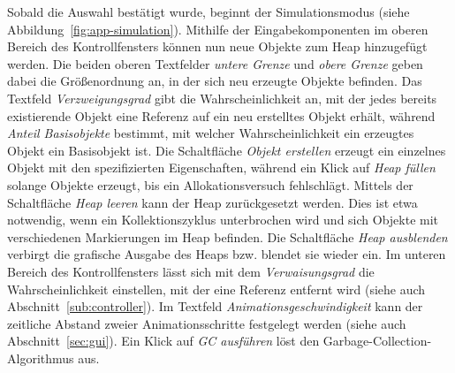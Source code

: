 Sobald die Auswahl bestätigt wurde, beginnt der Simulationsmodus (siehe Abbildung~\ref{fig:app-simulation}).
Mithilfe der Eingabekomponenten im oberen Bereich des Kontrollfensters können nun neue Objekte zum Heap hinzugefügt werden.
Die beiden oberen Textfelder \textit{untere Grenze} und \textit{obere Grenze} geben dabei die Größenordnung an, in der sich neu erzeugte Objekte befinden.
Das Textfeld \textit{Verzweigungsgrad} gibt die Wahrscheinlichkeit an, mit der jedes bereits existierende Objekt eine Referenz auf ein neu erstelltes Objekt erhält, während \textit{Anteil Basisobjekte} bestimmt, mit welcher Wahrscheinlichkeit ein erzeugtes Objekt ein Basisobjekt ist.
Die Schaltfläche \textit{Objekt erstellen} erzeugt ein einzelnes Objekt mit den spezifizierten Eigenschaften, während ein Klick auf \textit{Heap füllen} solange Objekte erzeugt, bis ein Allokationsversuch fehlschlägt.
Mittels der Schaltfläche \textit{Heap leeren} kann der Heap zurückgesetzt werden.
Dies ist etwa notwendig, wenn ein Kollektionszyklus unterbrochen wird und sich Objekte mit verschiedenen Markierungen im Heap befinden.
Die Schaltfläche \textit{Heap ausblenden} verbirgt die grafische Ausgabe des Heaps bzw. blendet sie wieder ein.
Im unteren Bereich des Kontrollfensters lässt sich mit dem \textit{Verwaisungsgrad} die Wahrscheinlichkeit einstellen, mit der eine Referenz entfernt wird (siehe auch Abschnitt~\ref{sub:controller}).
Im Textfeld \textit{Animationsgeschwindigkeit} kann der zeitliche Abstand zweier Animationsschritte festgelegt werden (siehe auch Abschnitt~\ref{sec:gui}).
Ein Klick auf \textit{GC ausführen} löst den Garbage-Collection-Algorithmus aus.

